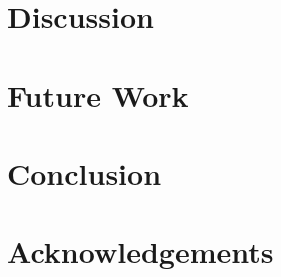 \documentclass[a4paper, twocolumn]{article}
\begin{document}
\section{Discussion}
\section{Future Work}
\section{Conclusion}
\section{Acknowledgements}




  
\end{document}
